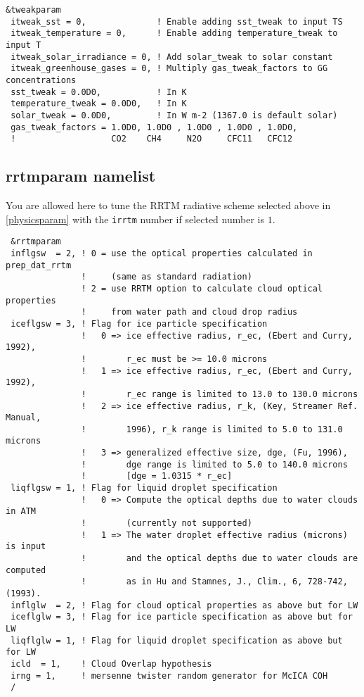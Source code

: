 {\footnotesize
\begin{Verbatim}
&tweakparam
 itweak_sst = 0,              ! Enable adding sst_tweak to input TS
 itweak_temperature = 0,      ! Enable adding temperature_tweak to input T
 itweak_solar_irradiance = 0, ! Add solar_tweak to solar constant
 itweak_greenhouse_gases = 0, ! Multiply gas_tweak_factors to GG concentrations
 sst_tweak = 0.0D0,           ! In K
 temperature_tweak = 0.0D0,   ! In K
 solar_tweak = 0.0D0,         ! In W m-2 (1367.0 is default solar)
 gas_tweak_factors = 1.0D0, 1.0D0 , 1.0D0 , 1.0D0 , 1.0D0,
 !                   CO2    CH4     N2O     CFC11   CFC12
\end{Verbatim}
}


\subsection{rrtmparam namelist}

You are allowed here to tune the RRTM radiative scheme selected above in
\ref{physicsparam} with the \verb=irrtm= number if selected number is $1$. 

{\footnotesize
\begin{Verbatim}
 &rrtmparam
 inflgsw  = 2, ! 0 = use the optical properties calculated in prep_dat_rrtm
               !     (same as standard radiation)
               ! 2 = use RRTM option to calculate cloud optical properties
               !     from water path and cloud drop radius
 iceflgsw = 3, ! Flag for ice particle specification
               !   0 => ice effective radius, r_ec, (Ebert and Curry, 1992),
               !        r_ec must be >= 10.0 microns
               !   1 => ice effective radius, r_ec, (Ebert and Curry, 1992),
               !        r_ec range is limited to 13.0 to 130.0 microns
               !   2 => ice effective radius, r_k, (Key, Streamer Ref. Manual,
               !        1996), r_k range is limited to 5.0 to 131.0 microns
               !   3 => generalized effective size, dge, (Fu, 1996),
               !        dge range is limited to 5.0 to 140.0 microns
               !        [dge = 1.0315 * r_ec]
 liqflgsw = 1, ! Flag for liquid droplet specification
               !   0 => Compute the optical depths due to water clouds in ATM
               !        (currently not supported)
               !   1 => The water droplet effective radius (microns) is input
               !        and the optical depths due to water clouds are computed
               !        as in Hu and Stamnes, J., Clim., 6, 728-742, (1993).
 inflglw  = 2, ! Flag for cloud optical properties as above but for LW
 iceflglw = 3, ! Flag for ice particle specification as above but for LW
 liqflglw = 1, ! Flag for liquid droplet specification as above but for LW
 icld  = 1,    ! Cloud Overlap hypothesis
 irng = 1,     ! mersenne twister random generator for McICA COH
 /
\end{Verbatim}
}


